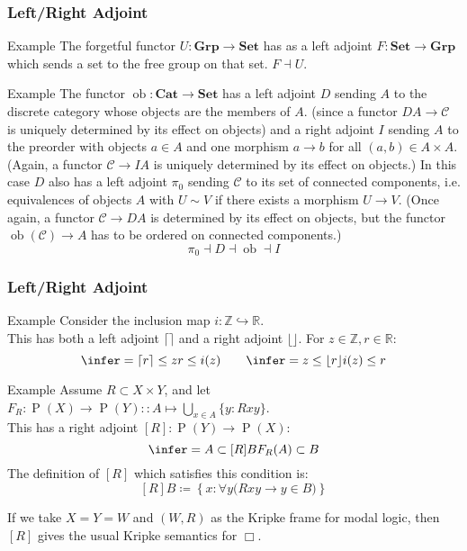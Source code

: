 \documentclass[UTF8,aspectratio=43,11pt,colorlinks,compress,openany]{beamer}%
\begin{document}
\begin{frame}\frametitle{Left/Right Adjoint}
\setlength\abovedisplayskip{0pt}
\setlength\belowdisplayskip{0pt}
\begin{block}{Example}
	The forgetful functor $U: \mathbf{Grp}\to\mathbf{Set}$ has as a left adjoint $F: \mathbf{Set}\to\mathbf{Grp}$ which sends a set to the free group on that set. $F\dashv U$.
\end{block}
\begin{block}{Example}
	The functor $\operatorname{ob}: \mathbf{Cat}\to\mathbf{Set}$ has a left adjoint $D$ sending $A$ to the discrete category whose objects are the members of $A$. (since a functor $DA\to \mathcal{C}$ is uniquely determined by its effect on objects) and a right adjoint $I$ sending $A$ to the preorder with objects $a\in A$ and one morphism $a\to b$ for all $(a,b)\in A\times A$. (Again, a functor $\mathcal{C}\to IA$ is uniquely determined by its effect on objects.) In this case $D$ also has a left adjoint $\pi_0$ sending $\mathcal{C}$ to its set of connected components, i.e. equivalences of objects $A$ with $U \sim V$ if there exists a morphism $U \to V$. (Once again, a functor $\mathcal{C}\to DA$ is determined by its effect on objects, but the functor $\operatorname{ob}(\mathcal{C})\to A$ has to be ordered on connected components.)
	\[\pi_0\dashv D\dashv \operatorname{ob}\dashv I\]
\end{block}
\end{frame}

\begin{frame}\frametitle{Left/Right Adjoint}
\setlength\abovedisplayskip{0pt}
\setlength\belowdisplayskip{0pt}
\begin{block}{Example}
Consider the inclusion map $i:\mathbb{Z}\hookrightarrow \mathbb{R}$.\\
This has both a left adjoint $\lceil\rceil$ and a right adjoint $\lfloor\rfloor$. For $z\in\mathbb{Z}, r\in\mathbb{R}$:
\[
\infer={\lceil r\rceil\leq z}{r\leq i(z)}\qquad
\infer={z\leq\lfloor r\rfloor}{i(z)\leq r}
\]
\end{block}
\begin{block}{Example}
Assume $R\subset X\times Y$, and let $F_R: \operatorname{P}(X)\to \operatorname{P}(Y) :: A\mapsto\bigcup\limits_{x\in A}\{y: Rxy\}$.\\
This has a right adjoint $[R]: \operatorname{P}(Y)\to \operatorname{P}(X)$:
\[\infer={A\subset [R]B}{F_R(A)\subset B}\]
The definition of $[R]$ which satisfies this condition is:
\[[R]B\coloneqq \left\{x: \forall y\big(Rxy\to y\in B\big)\right\}\]
\end{block}
If we take $X=Y=W$ and $(W,R)$ as the Kripke frame for modal logic, then $[R]$ gives the usual Kripke semantics for $\Box$.
\end{frame}
\end{document}
